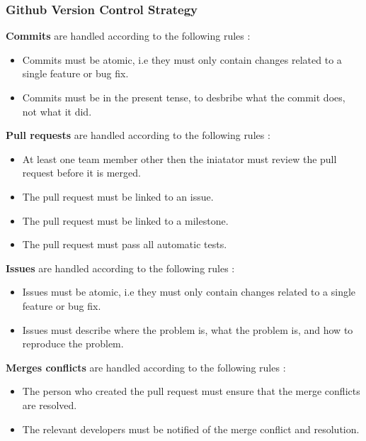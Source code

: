\documentclass[11pt,a4paper]{article}
\begin{document}
\subsubsection*{Github Version Control Strategy}

\textbf{Commits} are handled according to the following rules : 
\begin{itemize}
    \item[\textbullet] Commits must be atomic, i.e they must only contain changes related to a single feature or bug fix.
    \item[\textbullet] Commits must be in the present tense, to desbribe what the commit does, not what it did.
\end{itemize}

\textbf{Pull requests} are handled according to the following rules : 
\begin{itemize}
    \item[\textbullet] At least one team member other then the iniatator must review the pull request before it is merged.
    \item[\textbullet] The pull request must be linked to an issue.
    \item[\textbullet] The pull request must be linked to a milestone.
    \item[\textbullet] The pull request must pass all automatic tests.
\end{itemize}


\textbf{Issues} are handled according to the following rules : 
\begin{itemize}
    \item[\textbullet] Issues must be atomic, i.e they must only contain changes related to a single feature or bug fix.
    \item[\textbullet] Issues must describe where the problem is, what the problem is, and how to reproduce the problem.
\end{itemize}

\textbf{Merges conflicts} are handled according to the following rules : 
\begin{itemize}
    \item[\textbullet] The person who created the pull request must ensure that the merge conflicts are resolved.
    \item[\textbullet] The relevant developers must be notified of the merge conflict and resolution.
\end{itemize}
\end{document}
